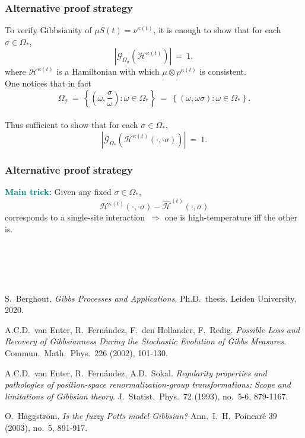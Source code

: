 \documentclass{beamer}
\newcommand{\G}{\mathcal{G}}
\renewcommand{\H}{\mathcal{H}}
\newcommand{\set}[1]{\left\{#1\right\}}
\newcommand{\oklepaj}[1]{\left(#1\right)}
\newcommand{\pika}{\boldsymbol{\cdot}}
\newcommand{\1}{\mathbbm{1}}
\newcommand{\5}{\vspace{0.5cm}}
\newcommand{\3}{\vspace{0.3cm}}
\theoremstyle{definition}
\begin{document}

\begin{frame}
\frametitle{Alternative proof strategy}
To verify Gibbsianity of $\mu S(t)=\nu^{\kappa(t)}$, it is enough to show that for each $\sigma\in\Omega_*$, 
$$|\G_{\Omega_\sigma}(\H^{\kappa(t)})| ~=~ 1,$$
where $\H^{\kappa(t)}$ is a Hamiltonian with which $\mu\otimes\rho^{\kappa(t)}$ is consistent. \\\vspace{0.5cm}\pause
One notices that in fact
$$\Omega_\sigma ~=~ \set{\!\oklepaj{\omega,\frac{\sigma}{\omega}}:\omega\in\Omega_*} ~=~ \set{(\omega,\omega\sigma):\omega\in\Omega_*}.$$\\\vspace{0.2cm}\pause
Thus sufficient to show that for each $\sigma\in\Omega_*$,
$$|\G_{\Omega_*}(\H^{\kappa(t)}(\pika,\pika\sigma))| ~=~ 1.$$
\end{frame}

\begin{frame}
\frametitle{Alternative proof strategy}
\textcolor{teal}{\textbf{Main trick:}} Given any fixed $\sigma\in\Omega_*$,
$$\H^{\kappa(t)}(\pika,\pika\sigma)-\hat{\H}^{(t)}(\pika,\sigma)$$
corresponds to a single-site interaction\pause~$\Rightarrow$ one is high-temperature iff the other is.
\end{frame}


\section*{~}

\begin{frame}
	\begin{thebibliography}{++}

 S.~Berghout. \textit{Gibbs Processes and Applications}. Ph.D.~thesis. Leiden University, 2020.

 A.C.D.~van Enter, R.~Fern\'andez, F.~den Hollander, F.~Redig. \textit{Possible Loss and Recovery of Gibbsianness During the Stochastic Evolution of Gibbs Measures}. Commun.~Math.~Phys.~226 (2002), 101-130.

 A.C.D.~van Enter, R.~Fern\'andez, A.D.~Sokal. \textit{Regularity properties and pathologies of position-space renormalization-group transformations: Scope and limitations of Gibbsian theory}. J.~Statist.~Phys.~72 (1993), no.~5-6, 879-1167.

 O.~H\"aggstr\"om. \textit{Is the fuzzy Potts model Gibbsian?} Ann.~I.~H.~Poincar\'e 39 (2003), no.~5, 891-917.

	\end{thebibliography}
\end{frame}

\end{document}
